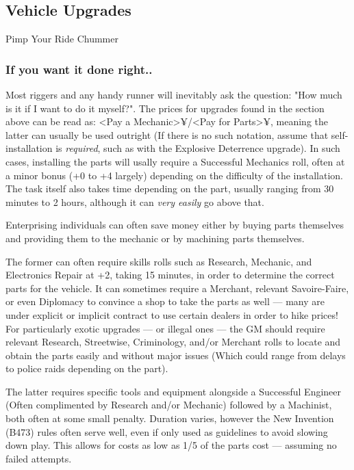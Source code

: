  
\begin{multicols*}{2}	
	
	\subsection{Vehicle Upgrades}
	
	Pimp Your Ride Chummer
	
	\subsubsection{If you want it done right..}
	
	Most riggers and any handy runner will inevitably ask the question: "How much is it if I want to do it myself?". The prices for upgrades found in the section above can be read as: <Pay a Mechanic>¥/<Pay for Parts>¥, meaning the latter can usually be used outright (If there is no such notation, assume that self-installation is \textit{required}, such as with the Explosive Deterrence upgrade). In such cases, installing the parts will usally require a Successful Mechanics roll, often at a minor bonus (+0 to +4 largely) depending on the difficulty of the installation. The task itself also takes time depending on the part, usually ranging from 30 minutes to 2 hours, although it can \textit{very easily} go above that.
	
	Enterprising individuals can often save money either by buying parts themselves and providing them to the mechanic or by machining parts themselves. 
	
	The former can often require skills rolls such as Research, Mechanic, and Electronics Repair at +2, taking 15 minutes, in order to determine the correct parts for the vehicle. It can sometimes require a Merchant, relevant Savoire-Faire, or even Diplomacy to convince a shop to take the parts as well — many are under explicit or implicit contract to use certain dealers in order to hike prices! For particularly exotic upgrades — or illegal ones — the GM should require relevant Research, Streetwise, Criminology, and/or Merchant rolls to locate and obtain the parts easily and without major issues (Which could range from delays to police raids depending on the part).
	
	The latter requires specific tools and equipment alongside a Successful Engineer (Often complimented by Research and/or Mechanic) followed by a Machinist, both often at some small penalty. Duration varies, however the New Invention (B473) rules often serve well, even if only used as guidelines to avoid slowing down play. This allows for costs as low as 1/5 of the parts cost — assuming no failed attempts.
			

\end{multicols*}
